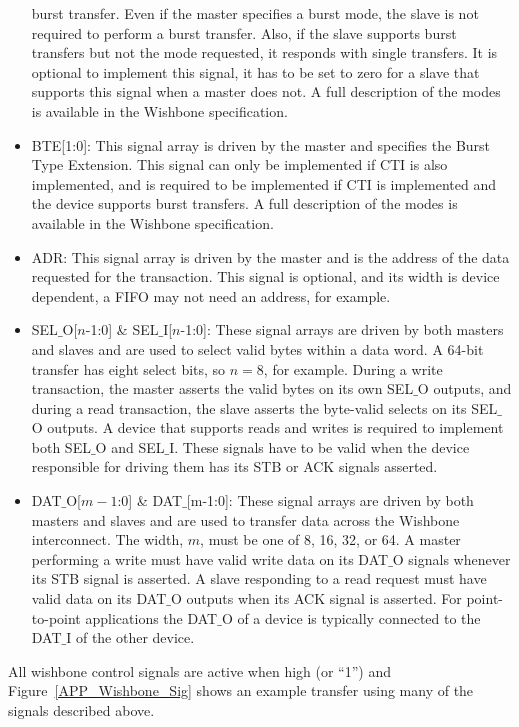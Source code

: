 \begin{itemize}
  burst transfer. Even if the master specifies a burst mode, the slave is not
  required to perform a burst transfer. Also, if the slave supports burst
  transfers but not the mode requested, it responds with single transfers. It
  is optional to implement this signal, it has to be set to zero for a slave
  that supports this signal when a master does not. A full description of the
  modes is available in the Wishbone specification\cite{WB3_Spec}.
 \item BTE[1:0]: This signal array is driven by the master and specifies the
 Burst Type Extension. This signal can only be implemented if CTI
 is also implemented, and is required to be implemented if CTI is implemented
 and the device supports burst transfers. A full description of the modes
 is available in the Wishbone specification\cite{WB3_Spec}.
 \item ADR: This signal array is driven by the master and is the
 address of the data requested for the transaction. This signal is
 optional, and its width is device dependent, a FIFO may not need an address,
 for example.
 \item SEL$\_$O[$n$-1:0] \& SEL$\_$I[$n$-1:0]: These signal arrays are driven
 by both masters and slaves and are used to select valid bytes within a data
 word. A 64-bit transfer has eight select bits, so $n=8$, for example. During a
 write transaction, the master asserts the valid bytes on its own SEL$\_$O
 outputs, and during a read transaction, the slave asserts the byte-valid
 selects on its SEL$\_$O outputs. A device that supports reads and writes is
 required to implement both SEL$\_$O and SEL$\_$I. These signals have to
 be valid when the device responsible for driving them has its STB or
 ACK signals asserted.
 \item DAT$\_$O[$m-1$:0] \& DAT$\_$[m-1:0]: These signal arrays are driven by
 both masters and slaves and are used to transfer data across the Wishbone
 interconnect. The width, $m$, must be one of 8, 16, 32, or 64. A master
 performing a write must have valid write data on its DAT$\_$O signals whenever
 its STB signal is asserted. A slave responding to a read request must have valid
 data on its DAT$\_$O outputs when its ACK signal is asserted. For
 point-to-point applications the DAT$\_$O of a device is typically connected to
 the DAT$\_$I of the other device.
\end{itemize}

All wishbone control signals are active when high (or ``1'') and
Figure~\ref{APP_Wishbone_Sig} shows an example transfer using many of the
signals described above.
